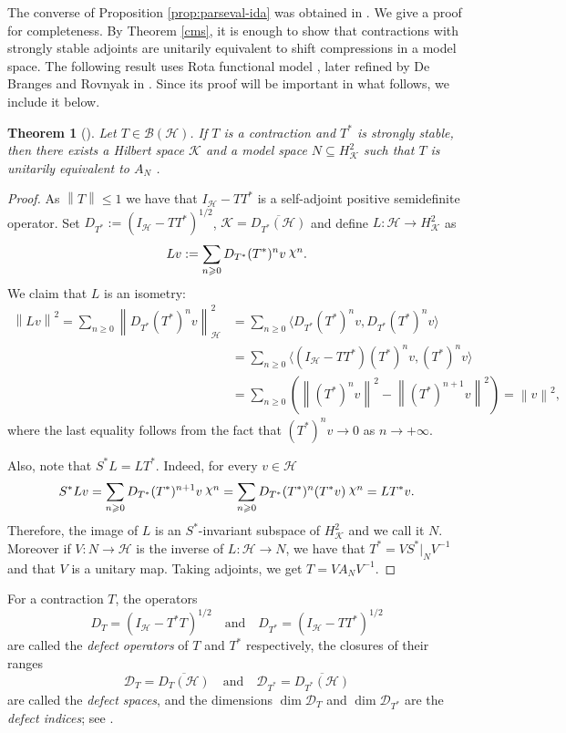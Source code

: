 \documentclass[a4paper,12pt]{amsart}
\def\HH{{\mathcal{H}}}
\def\KK{{\mathcal{K}}}
\DeclareRobustCommand{\rchi}{{\mathpalette\irchi\relax}}
\newcommand{\irchi}[2]{\raisebox{\depth}{$#1\chi$}} %
\newcommand{\norm}[1]{{\left\|{#1}\right\|}}
\newcommand{\scal}[1]{{\langle{#1}\rangle}}
\newtheorem{theorem}{Theorem}[section]
\theoremstyle{definition}
\begin{document}
The converse of Proposition \ref{prop:parseval-ida} was obtained in \cite{AP17}. We give a proof for completeness.
By Theorem \ref{cms}, it is enough to show that contractions with strongly stable adjoints are unitarily equivalent to shift compressions in a model space. The following result uses Rota functional model \cite{R}, later refined by De Branges and Rovnyak in \cite{BR64}. Since its proof will be important in what follows, we include it below. 
\begin{theorem}[{\cite[p. 18]{N}}]\label{niko}
Let $T\in\mathcal B(\mathcal H)$. If $T$ is a contraction and $T^*$ is strongly stable, then there exists a Hilbert space $\KK$ and a model space $N\subseteq H^2_{\KK}$ such that $T$ is unitarily equivalent to $A_N$ .
\end{theorem}
\begin{proof}
As $\norm{T}\leqslant1$ we have that $I_\HH-TT^*$ is a self-adjoint positive semidefinite operator. Set $D_{T^*}:=(I_\HH-TT^*)^{1/2}$, $\KK=\overline{D_{T^*}(\HH)}$ and define $L:\HH\to H^2_\KK$ as
\begin{equation*}
Lv:=\sum_{n\geqslant0}D_{T^*}(T^*)^nv\:\rchi^n.
\end{equation*}
We claim that $L$ is an isometry:
\begin{align*}
\norm{Lv}^2=\sum_{n\geqslant0}\norm{D_{T^*}(T^*)^nv}_\HH^2&=\sum_{n\geqslant0}\scal{D_{T^*}(T^*)^nv,D_{T^*}(T^*)^nv}
\\
&=\sum_{n\geqslant0}\scal{(I_\HH-TT^*)(T^*)^nv,(T^*)^nv}
\\
&=\sum_{n\geqslant0}\left(\norm{(T^*)^nv}^2-\norm{(T^*)^{n+1}v}^2\right)=\norm{v}^2,
\end{align*}
where the last equality follows from the fact that $(T^*)^nv\to0$ as $n\to+\infty$.

Also, note that $S^*L=LT^*$. Indeed, for every $v\in\HH$
\begin{equation*}
S^*Lv=\sum_{n\geqslant0}D_{T^*}(T^*)^{n+1}v\:\rchi^n=\sum_{n\geqslant0}D_{T^*}(T^*)^n(T^*v)\:\rchi^n=LT^*v.
\end{equation*}
Therefore, the image of $L$ is an $S^*$-invariant subspace of $H^2_\KK$ and we call it $N$. Moreover if $V:N\to\HH$ is the inverse of $L:\HH\to N$, we have that $T^*=V S^*|_N V^{-1}$ and that $V$ is a unitary map. Taking adjoints, we get $T=VA_NV^{-1}$.
\end{proof}

For a contraction $T$, the operators
\[
D_T = (I_{\mathcal{H}} - T^*T)^{1/2}
\quad \text{and} \quad
D_{T^*} = (I_{\mathcal{H}} - TT^*)^{1/2}
\]
are called the \emph{defect operators} of $T$ and $T^*$ respectively, the closures of their ranges
\[
\mathcal{D}_T = \overline{D_T(\mathcal{H})}
\quad \text{and} \quad
\mathcal{D}_{T^*} = \overline{D_{T^*}(\mathcal{H})}
\]
are called the \emph{defect spaces}, and the dimensions $\dim \mathcal{D}_T$ and $\dim \mathcal{D}_{T^*}$ are the \emph{defect indices}; see \cite{NFBK10}.
\end{document}
